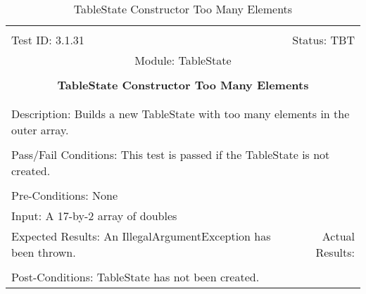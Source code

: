\documentclass[titlepage]{article}
\begin{document}
\begin{center}%
\begin{table}[h!]
\begin{tabular}{|l r|}\hline&\\[-2mm]
	Test ID: 3.1.31	&Status: TBT\\[-3mm]
	\multicolumn{2}{|c|}{Module: TableState}\\&\\
	\multicolumn{2}{|c|}{\textbf{\large{TableState Constructor Too Many Elements}}}\\&\\\hline&\\[-3mm]
	\multicolumn{2}{|p{\textwidth}|}{Description: Builds a new TableState with too many elements in the outer array.}\\[1mm]\hline&\\[-3mm]
	\multicolumn{2}{|p{\textwidth}|}{Pass/Fail Conditions: This test is passed if the TableState is not created.}\\[1mm]\hline&\\[-3mm]
	\multicolumn{2}{|p{\textwidth}|}{Pre-Conditions: None}\\[4mm]
	\multicolumn{2}{|p{\textwidth}|}{Input: A 17-by-2 array of doubles}\\[2mm]\hline
	\multicolumn{1}{|p{0.49\textwidth}}{Expected Results: An IllegalArgumentException has been thrown.}	&\multicolumn{1}{|p{0.45\textwidth}|}{Actual Results: }\\\hline&\\[-3mm]
	\multicolumn{2}{|p{\textwidth}|}{Post-Conditions: TableState has not been created.}\\\hline
\end{tabular}
\caption{TableState Constructor Too Many Elements}
\end{table}
\end{center}
\newpage
\end{document}
